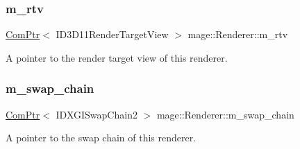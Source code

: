 \subsubsection{\texorpdfstring{m\+\_\+rtv}{m\_rtv}}
{\footnotesize\ttfamily \hyperlink{namespacemage_ae74f374780900893caa5555d1031fd79}{Com\+Ptr}$<$ I\+D3\+D11\+Render\+Target\+View $>$ mage\+::\+Renderer\+::m\+\_\+rtv\hspace{0.3cm}{\ttfamily [private]}}

A pointer to the render target view of this renderer. \hypertarget{classmage_1_1_renderer_a5419a7a11e8f0f69e92dd6a5cb9bd217}{}\label{classmage_1_1_renderer_a5419a7a11e8f0f69e92dd6a5cb9bd217} 
\subsubsection{\texorpdfstring{m\+\_\+swap\+\_\+chain}{m\_swap\_chain}}
{\footnotesize\ttfamily \hyperlink{namespacemage_ae74f374780900893caa5555d1031fd79}{Com\+Ptr}$<$ I\+D\+X\+G\+I\+Swap\+Chain2 $>$ mage\+::\+Renderer\+::m\+\_\+swap\+\_\+chain\hspace{0.3cm}{\ttfamily [private]}}

A pointer to the swap chain of this renderer. 